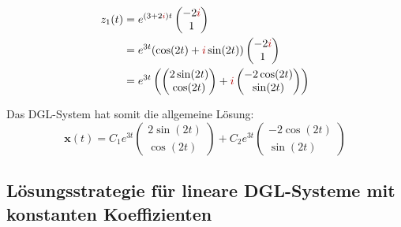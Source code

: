 \documentclass[12pt, a4paper]{scrreprt}
\begin{document}
\begin{align*}
  z_1(t) &= e^{(3 + 2 \mytextred{i}) t}
  \begin{pmatrix}
    -2 \mytextred{i}\\
    1
  \end{pmatrix}\\
  &= e^{3t} (\cos (2t) + \mytextred{i} \sin (2t))
  \begin{pmatrix}
    -2 \mytextred{i}\\
    1
  \end{pmatrix}\\
         &= e^{3t} \left(
           \begin{pmatrix}
             2 \sin (2t)\\
             \cos (2t)
           \end{pmatrix}
  +\mytextred{i}
  \begin{pmatrix}
    -2 \cos (2t)\\
    \sin (2t)
  \end{pmatrix}
           \right)
\end{align*}

Das DGL-System hat somit die allgemeine Lösung:
\[
  \mathbf{x}(t) = C_1 e^{3t}
  \begin{pmatrix}
    2 \sin (2t)\\
    \cos (2t)
  \end{pmatrix}
  + C_2 e^{3t}
  \begin{pmatrix}
    -2 \cos (2t)\\
    \sin (2t)
  \end{pmatrix}
\]

\subsection{Lösungsstrategie für lineare DGL-Systeme mit konstanten Koeffizienten}
\end{document}
